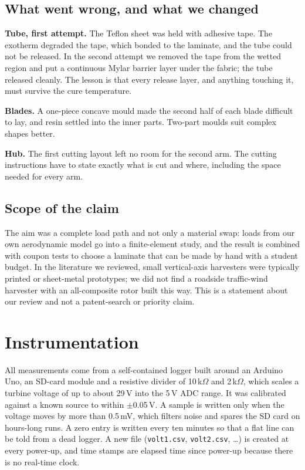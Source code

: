 \documentclass[11pt,letterpaper]{article}
\begin{document}
\subsection{What went wrong, and what we changed}
\textbf{Tube, first attempt.} The Teflon sheet was held with adhesive tape. The exotherm degraded the tape, which bonded to the laminate, and the tube could not be released. In the second attempt we removed the tape from the wetted region and put a continuous Mylar barrier layer under the fabric; the tube released cleanly. The lesson is that every release layer, and anything touching it, must survive the cure temperature.

\textbf{Blades.} A one-piece concave mould made the second half of each blade difficult to lay, and resin settled into the inner parts. Two-part moulds suit complex shapes better.

\textbf{Hub.} The first cutting layout left no room for the second arm. The cutting instructions have to state exactly what is cut and where, including the space needed for every arm.

\subsection{Scope of the claim}
The aim was a complete load path and not only a material swap: loads from our own aerodynamic model go into a finite-element study, and the result is combined with coupon tests to choose a laminate that can be made by hand with a student budget. In the literature we reviewed, small vertical-axis harvesters were typically printed or sheet-metal prototypes; we did not find a roadside traffic-wind harvester with an all-composite rotor built this way. This is a statement about our review and not a patent-search or priority claim.

\section{Instrumentation}\label{sec:daq}
All measurements come from a self-contained logger built around an Arduino Uno, an SD-card module and a resistive divider of 10\,k$\Omega$ and 2\,k$\Omega$, which scales a turbine voltage of up to about 29\,V into the 5\,V ADC range. It was calibrated against a known source to within $\pm$0.05\,V. A sample is written only when the voltage moves by more than 0.5\,mV, which filters noise and spares the SD card on hours-long runs. A zero entry is written every ten minutes so that a flat line can be told from a dead logger. A new file (\texttt{volt1.csv}, \texttt{volt2.csv}, \ldots) is created at every power-up, and time stamps are elapsed time since power-up because there is no real-time clock.
\end{document}
